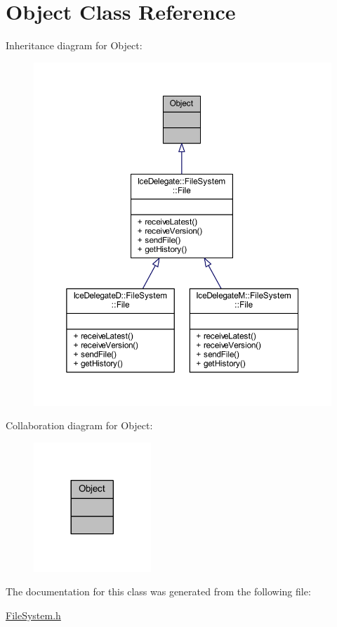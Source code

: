 \hypertarget{class_ice_delegate_1_1_ice_1_1_object}{}\section{Object Class Reference}
\label{class_ice_delegate_1_1_ice_1_1_object}


Inheritance diagram for Object\+:
\nopagebreak
\begin{figure}[H]
\begin{center}
\leavevmode
\includegraphics[width=350pt]{class_ice_delegate_1_1_ice_1_1_object__inherit__graph}
\end{center}
\end{figure}


Collaboration diagram for Object\+:
\nopagebreak
\begin{figure}[H]
\begin{center}
\leavevmode
\includegraphics[width=125pt]{class_ice_delegate_1_1_ice_1_1_object__coll__graph}
\end{center}
\end{figure}


The documentation for this class was generated from the following file\+:\begin{DoxyCompactItemize}
\item 
\hyperlink{_file_system_8h}{File\+System.\+h}\end{DoxyCompactItemize}
